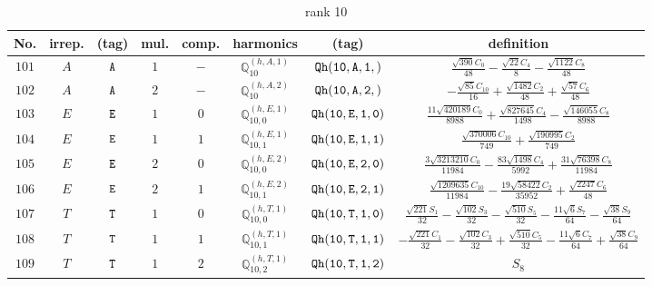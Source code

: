 \documentclass[fleqn,8pt]{jsarticle}
\begin{document}
\begin{table}[ht!]
\begin{center}
\caption{rank 10}
\renewcommand{\arraystretch}{1.3}
\begin{tabular}{cccccccc} \hline \hline
No. & irrep. & (tag) & mul. & comp. & harmonics & (tag) & definition \\ \hline
$ 101 $ & $ A $ & $ {\tt A} $ & $ 1 $ & $ - $ & $ \mathbb{Q}_{10}^{(h,A,1)} $ & $ {\tt Qh(10,A,1,)} $ & $ \frac{\sqrt{390} C_{0}}{48} - \frac{\sqrt{22} C_{4}}{8} - \frac{\sqrt{1122} C_{8}}{48} $ \\
$ 102 $ & $ A $ & $ {\tt A} $ & $ 2 $ & $ - $ & $ \mathbb{Q}_{10}^{(h,A,2)} $ & $ {\tt Qh(10,A,2,)} $ & $ - \frac{\sqrt{85} C_{10}}{16} + \frac{\sqrt{1482} C_{2}}{48} + \frac{\sqrt{57} C_{6}}{48} $ \\
$ 103 $ & $ E $ & $ {\tt E} $ & $ 1 $ & $ 0 $ & $ \mathbb{Q}_{10,0}^{(h,E,1)} $ & $ {\tt Qh(10,E,1,0)} $ & $ \frac{11 \sqrt{420189} C_{0}}{8988} + \frac{\sqrt{827645} C_{4}}{1498} - \frac{\sqrt{146055} C_{8}}{8988} $ \\
$ 104 $ & $ E $ & $ {\tt E} $ & $ 1 $ & $ 1 $ & $ \mathbb{Q}_{10,1}^{(h,E,1)} $ & $ {\tt Qh(10,E,1,1)} $ & $ \frac{\sqrt{370006} C_{10}}{749} + \frac{\sqrt{190995} C_{2}}{749} $ \\
$ 105 $ & $ E $ & $ {\tt E} $ & $ 2 $ & $ 0 $ & $ \mathbb{Q}_{10,0}^{(h,E,2)} $ & $ {\tt Qh(10,E,2,0)} $ & $ \frac{3 \sqrt{3213210} C_{0}}{11984} - \frac{83 \sqrt{1498} C_{4}}{5992} + \frac{31 \sqrt{76398} C_{8}}{11984} $ \\
$ 106 $ & $ E $ & $ {\tt E} $ & $ 2 $ & $ 1 $ & $ \mathbb{Q}_{10,1}^{(h,E,2)} $ & $ {\tt Qh(10,E,2,1)} $ & $ \frac{\sqrt{1209635} C_{10}}{11984} - \frac{19 \sqrt{58422} C_{2}}{35952} + \frac{\sqrt{2247} C_{6}}{48} $ \\
$ 107 $ & $ T $ & $ {\tt T} $ & $ 1 $ & $ 0 $ & $ \mathbb{Q}_{10,0}^{(h,T,1)} $ & $ {\tt Qh(10,T,1,0)} $ & $ \frac{\sqrt{221} S_{1}}{32} - \frac{\sqrt{102} S_{3}}{32} - \frac{\sqrt{510} S_{5}}{32} - \frac{11 \sqrt{6} S_{7}}{64} - \frac{\sqrt{38} S_{9}}{64} $ \\
$ 108 $ & $ T $ & $ {\tt T} $ & $ 1 $ & $ 1 $ & $ \mathbb{Q}_{10,1}^{(h,T,1)} $ & $ {\tt Qh(10,T,1,1)} $ & $ - \frac{\sqrt{221} C_{1}}{32} - \frac{\sqrt{102} C_{3}}{32} + \frac{\sqrt{510} C_{5}}{32} - \frac{11 \sqrt{6} C_{7}}{64} + \frac{\sqrt{38} C_{9}}{64} $ \\
$ 109 $ & $ T $ & $ {\tt T} $ & $ 1 $ & $ 2 $ & $ \mathbb{Q}_{10,2}^{(h,T,1)} $ & $ {\tt Qh(10,T,1,2)} $ & $ S_{8} $ \\

\end{tabular}
\end{center}
\end{table}
\end{document}
